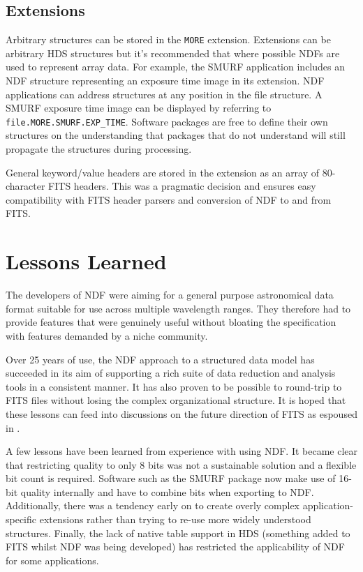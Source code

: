 \documentclass[11pt,twoside]{article}
\begin{document}
\subsection{Extensions}

Arbitrary structures can be stored in the \texttt{MORE}
extension. Extensions can be arbitrary HDS structures but it's
recommended that where possible NDFs are used to represent array
data. For example, the SMURF application includes an NDF structure
representing an exposure time image in its extension. NDF applications
can address structures at any position in the file structure. A SMURF
exposure time image can be displayed by referring to
\texttt{file.MORE.SMURF.EXP\_TIME}. Software packages are free to
define their own structures on the understanding that packages that do
not understand will still propagate the structures during processing.

General keyword/value headers are stored in the extension as an array of
80-character FITS headers. This was a pragmatic decision and ensures
easy compatibility with FITS header parsers and conversion of NDF to
and from FITS.

\section{Lessons Learned}

The developers of NDF were aiming for a general purpose astronomical
data format suitable for use across multiple wavelength ranges. They
therefore had to provide features that were genuinely useful without
bloating the specification with features demanded by a niche
community.

Over 25 years of use, the NDF approach to a structured data model has
succeeded in its aim of supporting a rich suite of data reduction and
analysis tools in a consistent manner. It has also proven to be
possible to round-trip to FITS files without losing the complex
organizational structure. It is hoped that these lessons can feed into
discussions on the future direction of FITS as espoused in
\citet{P90_adassxxiii}.

A few lessons have been learned from experience with using NDF. It
became clear that restricting quality to only 8 bits was not a
sustainable solution and a flexible bit count is required. Software
such as the SMURF package \citep{2013MNRAS.430.2545C} now make use of
16-bit quality internally and have to combine bits when exporting to
NDF. Additionally, there was a tendency early on to create overly
complex application-specific extensions rather than trying to re-use
more widely understood structures. Finally, the lack of native table
support in HDS (something added to FITS \citep{1988A&AS...73..365H}
whilst NDF was being developed) has restricted the applicability of
NDF for some applications.


\end{document}
